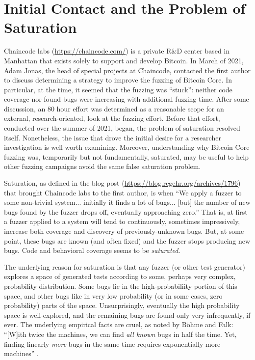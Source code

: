 \section{Initial Contact and the Problem of Saturation}

Chaincode labs (\url{https://chaincode.com/}) is a private R\&D center based in Manhattan that exists solely to support and develop Bitcoin.  In March of 2021, Adam Jonas, the head of special projects at Chaincode, contacted the first author to discuss determining a strategy to improve the fuzzing of Bitcoin Core.  In particular, at the time, it seemed that the fuzzing was ``stuck'': neither code coverage nor found bugs were increasing with additional fuzzing time.  After some discussion, an 80 hour effort was determined as a reasonable scope for an external, research-oriented, look at the fuzzing effort.  Before that effort, conducted over the summer of 2021, began, the problem of saturation resolved itself.  Nonetheless, the issue that drove the initial desire for a researcher investigation is well worth examining.  Moreover, understanding why Bitcoin Core fuzzing was, temporarily but not fundamentally, saturated, may be useful to help other fuzzing campaigns avoid the same false saturation problem.

Saturation, as defined in the blog post (\url{https://blog.regehr.org/archives/1796}) that brought Chaincode labs to the first author, is when ``We apply a fuzzer to some non-trivial system... initially it finds a lot of bugs... [but] the number of new bugs found by the fuzzer drops off, eventually approaching zero.''  That is, at first a fuzzer applied to a system will tend to continuously, sometimes impressively, increase both coverage and discovery of previously-unknown bugs.  But, at some point, these bugs are known (and often fixed) and the fuzzer stops producing new bugs.  Code and behavioral coverage seems to be \emph{saturated}.

The underlying reason for saturation is that any fuzzer (or other test generator) explores a space of generated tests according to some, perhaps very complex, probability distribution.  Some bugs lie in the high-probabiliity portion of this space, and other bugs like in very low probability (or in some cases, zero probability) parts of the space.  Unsurprisingly, eventually the high probability space is well-explored, and the remaining bugs are found only very infrequently, if ever.  The underlying empirical facts are cruel, as noted by B\"{o}hme and Falk:  ``[W]ith twice the machines, we can find \emph{all known} bugs in half the time. Yet, finding linearly \emph{more} bugs in the same time requires exponentially more machines'' \cite{fuzzexp}.

